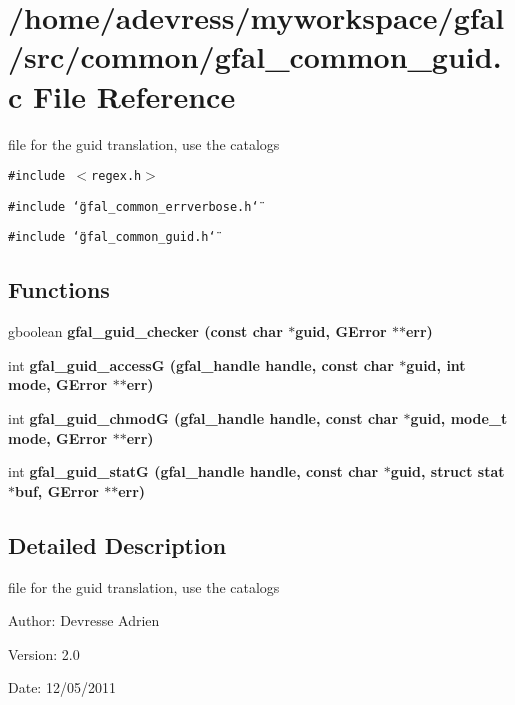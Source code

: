 \section{/home/adevress/myworkspace/gfal/src/common/gfal\_\-common\_\-guid.c File Reference}
\label{gfal__common__guid_8c}
file for the guid translation, use the catalogs 

{\tt \#include $<$regex.h$>$}\par
{\tt \#include \char`\"{}gfal\_\-common\_\-errverbose.h\char`\"{}}\par
{\tt \#include \char`\"{}gfal\_\-common\_\-guid.h\char`\"{}}\par
\subsection*{Functions}
\begin{CompactItemize}
\item 
gboolean \bf{gfal\_\-guid\_\-checker} (const char $\ast$guid, GError $\ast$$\ast$err)
\item 
int \bf{gfal\_\-guid\_\-access\-G} (gfal\_\-handle handle, const char $\ast$guid, int mode, GError $\ast$$\ast$err)
\item 
int \bf{gfal\_\-guid\_\-chmod\-G} (gfal\_\-handle handle, const char $\ast$guid, mode\_\-t mode, GError $\ast$$\ast$err)
\item 
int \bf{gfal\_\-guid\_\-stat\-G} (gfal\_\-handle handle, const char $\ast$guid, struct stat $\ast$buf, GError $\ast$$\ast$err)
\end{CompactItemize}


\subsection{Detailed Description}
file for the guid translation, use the catalogs 

\begin{Desc}
\item[Author:]Devresse Adrien \end{Desc}
\begin{Desc}
\item[Version:]2.0 \end{Desc}
\begin{Desc}
\item[Date:]12/05/2011 \end{Desc}


